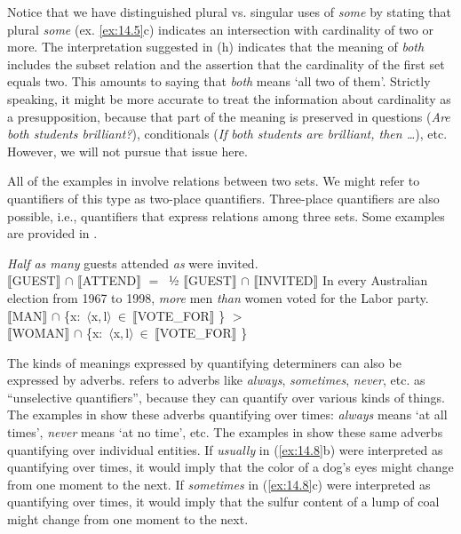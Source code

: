 Notice that we have distinguished plural vs. singular uses of \textit{some} by stating that plural \textit{some} (ex. \ref{ex:14.5}c) indicates an intersection with cardinality of two or more. The interpretation suggested in (h) indicates that the meaning of \textit{both} includes the subset relation and the assertion that the cardinality of the first set equals two. This amounts to saying that \textit{both} means ‘all two of them’. Strictly speaking, it might be more accurate to treat the information about cardinality as a presupposition, because that part of the meaning is preserved in questions (\textit{Are} \textit{both students brilliant?}), conditionals (\textit{If} \textit{both students are brilliant, then …}), etc. However, we will not pursue that issue here.



All of the examples in  involve relations between two sets. We might refer to quantifiers of this type as two-place quantifiers. Three-place quantifiers are also possible, i.e., quantifiers that express relations among three sets. Some examples are provided in .


\ea \label{ex:14.6}
\ea  \textit{Half as many} guests attended \textit{as} were invited.\\
{\textbar} $\llbracket$GUEST$\rrbracket$  ${\cap}$ $\llbracket$ATTEND$\rrbracket$  {\textbar}  $= \:$  ½  {\textbar} $\llbracket$GUEST$\rrbracket$  ${\cap}$ $\llbracket$INVITED$\rrbracket$  {\textbar}
\ex In every {Australian} election from 1967 to 1998, \textit{more} men \textit{than} women voted for the Labor party.\\
{\textbar} $\llbracket$MAN$\rrbracket$  ${\cap}$ \{x:~$\langle$x,\,l$\rangle \: {\in} \: \llbracket$VOTE\_FOR$\rrbracket$ \}{\textbar}  $>$ \\ {\textbar} $\llbracket$WOMAN$\rrbracket$  ${\cap}$ \{x:~$\langle$x,\,l$\rangle \: {\in} \: \llbracket$VOTE\_FOR$\rrbracket$ \}{\textbar}
\z \z


The kinds of meanings expressed by quantifying determiners can also be expressed by adverbs. \citet{Lewis1975} refers to adverbs like \textit{always}, \textit{sometimes}, \textit{never}, etc. as “unselective quantifiers”, because they can quantify over various kinds of things. The examples in  show these adverbs quantifying over times: \textit{always} means ‘at all times’, \textit{never} means ‘at no time’, etc. The examples in  show these same adverbs quantifying over individual entities. If \textit{usually} in (\ref{ex:14.8}b) were interpreted as quantifying over times, it would imply that the color of a dog’s eyes might change from one moment to the next. If \textit{sometimes} in (\ref{ex:14.8}c) were interpreted as quantifying over times, it would imply that the sulfur content of a lump of coal might change from one moment to the next.


